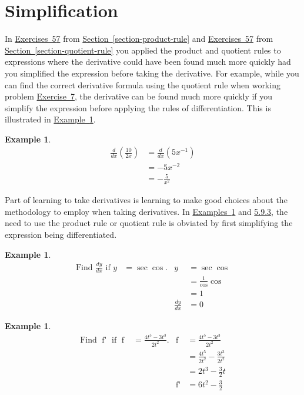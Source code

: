 \documentclass[12pt,]{book}
\theoremstyle{plain}
\theoremstyle{definition}
\newtheorem{example}[theorem]{Example}
\numberwithin{equation}{section}
\newcommand{\fe}[2]{\mathop{{#1}{\left(#2\right)}}}
\newcommand{\fd}[1]{#1'}
\newcommand{\lz}[2]{\frac{d#1}{d#2}}
\newcommand{\lzoo}[2]{{\frac{d}{d#1}}{\left(#2\right)}}
\begin{document}
\section[Simplification]{Simplification}\label{section-simplification}
In \hyperref[unsimplified-product-first]{Exercises~5}\textendash{}\hyperref[unsimplified-product-last]{7} from \hyperref[section-product-rule]{Section~\ref*{section-product-rule}} and \hyperref[unsimplified-quotient-first]{Exercises~5}\textendash{}\hyperref[unsimplified-quotient-last]{7} from \hyperref[section-quotient-rule]{Section~\ref*{section-quotient-rule}} you applied the product and quotient rules to expressions where the derivative could have been found much more quickly had you simplified the expression before taking the derivative.  For example, while you can find the correct derivative formula using the quotient rule when working problem \hyperref[unsimplified-quotient-last]{Exercise~7}, the derivative can be found much more quickly if you simplify the expression before applying the rules of differentiation. This is illustrated in \hyperref[example-simplify-first]{Example~\ref*{example-simplify-first}}.%
\begin{example}\label{example-simplify-first}
\begin{align*}
\lzoo{x}{\frac{10}{2x}}&=\lzoo{x}{5x^{-1}}\\
&=-5x^{-2}\\
&=-\frac{5}{x^{2}}
\end{align*}%
\end{example}
\par
Part of learning to take derivatives is learning  to make good choices about the methodology to employ when taking derivatives.  In \hyperref[example-simplify-second]{Examples~\ref*{example-simplify-second}} and \hyperref[example-simplify-third]{5.9.3}, the need to use the product rule or quotient rule is obviated by first simplifying the expression being differentiated.%
\begin{example}\label{example-simplify-second}
\begin{align*}
\text{Find }\lz{y}{x}\text{ if }y&=\fe{\sec}{x}\fe{\cos}{x}\text{.}&y&=\fe{\sec}{x}\fe{\cos}{x}\\
&&&=\frac{1}{\fe{\cos}{x}}\fe{\cos}{x}\\
&&&=1\\
&&\lz{y}{x}&=0
\end{align*}%
\end{example}
\begin{example}\label{example-simplify-third}
\begin{align*}
\text{Find }\fe{\fd{f}}{t}\text{ if }\fe{f}{t}&=\frac{4t^5-3t^3}{2t^2}\text{.}&\fe{f}{t}&=\frac{4t^5-3t^3}{2t^2}\\
&&&=\frac{4t^5}{2t^2}-\frac{3t^3}{2t^2}\\
&&&=2t^3-\frac{3}{2}t\\
&&\fe{\fd{f}}{t}&=6t^2-\frac{3}{2}
\end{align*}%
\end{example}
\typeout{************************************************}
\typeout{************************************************}
\end{document}
